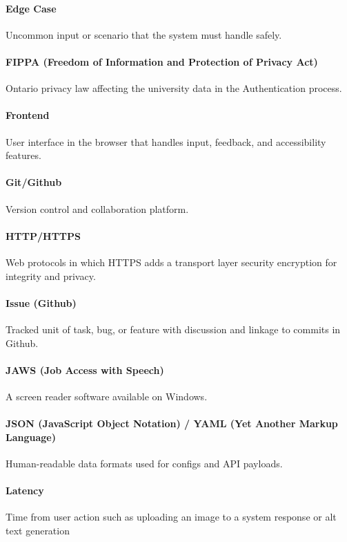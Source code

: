 \documentclass[12pt, titlepage]{article}
\begin{document}
\paragraph*{Edge Case}
Uncommon input or scenario that the system must handle safely.

\paragraph*{FIPPA (Freedom of Information and Protection of Privacy Act)}
Ontario privacy law affecting the university data in the Authentication process.

\paragraph*{Frontend}
User interface in the browser that handles input, feedback, and
accessibility features.

\paragraph*{Git/Github}
Version control and collaboration platform.

\paragraph*{HTTP/HTTPS}
Web protocols in which HTTPS adds a transport layer security
encryption for integrity and privacy.

\paragraph*{Issue (Github)}
Tracked unit of task, bug, or feature with discussion and linkage to
commits in Github.

\paragraph*{JAWS (Job Access with Speech)}
A screen reader software available on Windows.

\paragraph*{JSON (JavaScript Object Notation) / YAML (Yet Another
Markup Language)}
Human-readable data formats used for configs and API payloads.

\paragraph*{Latency}
Time from user action such as uploading an image to a system response
or alt text generation
\end{document}
